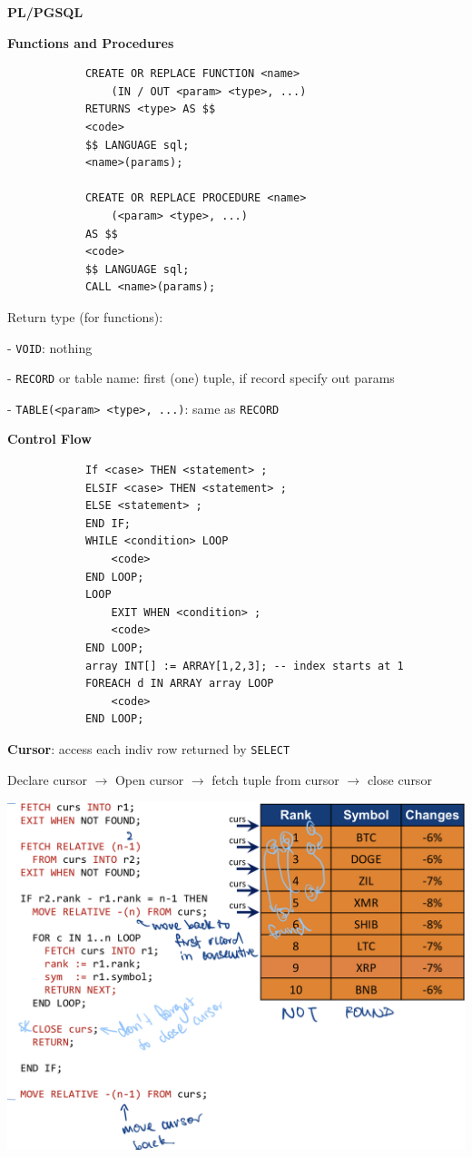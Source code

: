 \documentclass[10pt, a4paper]{article}
\newcommand{\header}[1]{{\normalsize\textbf{#1}}}
\begin{document}
\begin{multicols*}{3}
		\header{PL/PGSQL}

		\textbf{Functions and Procedures}
		\begin{verbatim}
			CREATE OR REPLACE FUNCTION <name>
			    (IN / OUT <param> <type>, ...)
			RETURNS <type> AS $$
			<code>
			$$ LANGUAGE sql;
			<name>(params);

			CREATE OR REPLACE PROCEDURE <name> 
			    (<param> <type>, ...)
			AS $$ 
			<code>
			$$ LANGUAGE sql;
			CALL <name>(params);
		\end{verbatim}
		Return type (for functions):
		
		- \texttt{VOID}: nothing

		- \texttt{RECORD} or table name: first (one) tuple, if record specify out params

		- \texttt{TABLE(<param> <type>, ...)}: same as \texttt{RECORD}

		\textbf{Control Flow}
		\begin{verbatim}
			If <case> THEN <statement> ;
			ELSIF <case> THEN <statement> ;
			ELSE <statement> ;
			END IF;
			WHILE <condition> LOOP
			    <code>
			END LOOP;
			LOOP
			    EXIT WHEN <condition> ;
				<code>
			END LOOP;
			array INT[] := ARRAY[1,2,3]; -- index starts at 1
			FOREACH d IN ARRAY array LOOP
			    <code>
			END LOOP;
		\end{verbatim}

		\textbf{Cursor}: access each indiv row returned by \texttt{SELECT}

		Declare cursor $\rightarrow$ Open cursor $\rightarrow$ fetch tuple from cursor $\rightarrow$ close cursor

		\includegraphics[scale=0.15]{./assets/cursor.png}


\end{multicols*}
\end{document}
